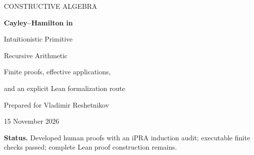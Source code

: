 \documentclass[11pt,letterpaper]{article}
\theoremstyle{remark}
\numberwithin{equation}{section}
\begin{document}
\hypersetup{pageanchor=false}
\begin{titlepage}
\vspace*{0.6in}
{\Large\sffamily\color{blue!45!black}CONSTRUCTIVE ALGEBRA}\par
\vspace{0.35in}
{\huge\bfseries Cayley--Hamilton in\par
 Intuitionistic Primitive\par Recursive Arithmetic}\par
\vspace{0.25in}
{\Large Finite proofs, effective applications,\par
 and an explicit Lean formalization route}\par
\vspace{0.55in}
{\large Prepared for Vladimir Reshetnikov}\par
{\large 15 November 2026}\par
\vspace{0.5in}
\begin{abstract}
We prove a uniform arithmetized Cayley--Hamilton theorem using finite
determinant expansion, the adjugate identity, and coefficient telescoping.
Explicit coding reduces the theorem to a primitive recursive numerical
equation with quantifier-free induction invariants. The development
covers 27 result families: polynomial adjugates, monic reduction, unit
inversion, effective minimal polynomials, Newton and Bell identities,
Hessenberg formulas, Faddeev--LeVerrier, finite formal logarithms,
module and integrality consequences, interpolation, quantitative matrix
functions, and specified quaternionic extensions. Every use of division,
spectral data, coordinates, or analytic convergence is made explicit.
The accompanying Lean sources define the numerical checker, the exact
object-language target, and ordinary Mathlib comparison statements.
They are an uncompiled outline, not a completed Lean verification.
Exact executable checks and pinned source provenance accompany the proof.
\end{abstract}
\vfill
\noindent\textbf{Status.} Developed human proofs with an iPRA induction audit;
executable finite checks passed; complete Lean proof construction remains.
\end{titlepage}
\hypersetup{pageanchor=true}

\tableofcontents
\clearpage

\clearpage





\end{document}
